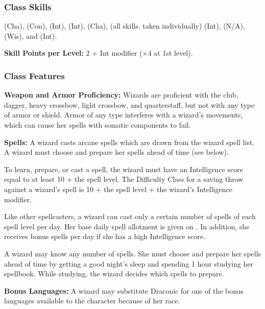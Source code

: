 \subsubsection{Class Skills}
 (Cha),  (Con),  (Int),  (Int),  (Cha),  (all skills, taken individually) (Int),  (N/A),  (Wis), and  (Int).

\textbf{Skill Points per Level:} 2 + Int modifier ($\times4$ at 1st level).

\subsubsection{Class Features}
\textbf{Weapon and Armor Proficiency:} Wizards are proficient with the club, dagger, heavy crossbow, light crossbow, and quarterstaff, but not with any type of armor or shield. Armor of any type interferes with a wizard's movements, which can cause her spells with somatic components to fail.

\textbf{Spells:} A wizard casts arcane spells which are drawn from the wizard spell list. A wizard must choose and prepare her spells ahead of time (see below).

To learn, prepare, or cast a spell, the wizard must have an Intelligence score equal to at least 10 + the spell level. The Difficulty Class for a saving throw against a wizard's spell is 10 + the spell level + the wizard's Intelligence modifier.

Like other spellcasters, a wizard can cast only a certain number of spells of each spell level per day. Her base daily spell allotment is given on . In addition, she receives bonus spells per day if she has a high Intelligence score.

A wizard may know any number of spells. She must choose and prepare her spells ahead of time by getting a good night's sleep and spending 1 hour studying her spellbook. While studying, the wizard decides which spells to prepare.

\textbf{Bonus Languages:} A wizard may substitute Draconic for one of the bonus languages available to the character because of her race.

